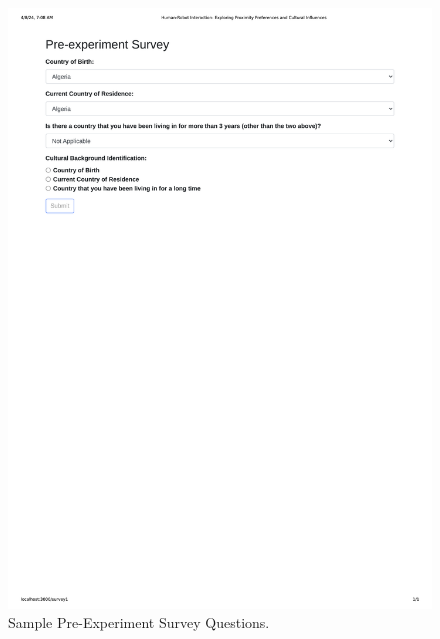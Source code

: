 \begin{figure}
    \begin{center}
        \noindent\includegraphics[width=\linewidth]{Appendices/survey1.png}  
        \caption{Sample Pre-Experiment Survey Questions.}
        \label{fig:figure2}
    \end{center}
\end{figure}


